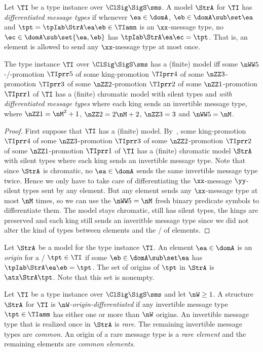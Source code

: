 \begin{definition}
Let $\TI$ be a type instance over $\ClSig\SigS\sms$.
A model $\StrA$ for $\TI$ has \emph{differentiated message types}
if whenever $\ea\in\domA$, $\eb\in\domA\sub\set\ea$
and $\tpt = \tpIab\StrA\ea\eb\in\TIamn$ is an $\xx$-message type,
no $\ec\in\domA\sub\set{\ea,\eb}$ has $\tpIab\StrA\ea\ec = \tpt$.
That is, an element is allowed to send any $\xx$-message type at most once.
\end{definition}
\begin{remark}\label{rem:prop-diff-msg-tp}
The type instance $\TI$ over $\ClSig\SigS\sms$ has a (finite) model
iff some $\nWW5$-\twotype/-promotion $\TIprr5$
of some king-promotion $\TIprr4$
of some $\nZZ3$-promotion $\TIprr3$
of some $\nZZ2$-promotion $\TIprr2$
of some $\nZZ1$-promotion $\TIprr1$ 
of $\TI$ has a (finite) chromatic model with silent types
and \emph{with differentiated message types} 
where each king sends an invertible message type,
where $\nZZ1 = \nM^2+1$, $\nZZ2 = 2\nM+2$, $\nZZ3 = 3$ and $\nWW5 = \nM$.
\end{remark}
\begin{proof}
First suppose that $\TI$ has a (finite) model.
By~,
some king-promotion $\TIprr4$
of some $\nZZ3$-promotion $\TIprr3$
of some $\nZZ2$-promotion $\TIprr2$
of some $\nZZ1$-promotion $\TIprr1$
of $\TI$ has a (finite) chromatic model $\StrA$ with silent types where each
king sends an invertible message type.
Note that since $\StrA$ is chromatic, no $\ea\in\domA$ sends the same invertible
message type twice.
Hence we only have to take care of differentiating the $\xx$-message
$\yy$-silent types sent by any element.
But any element sends any $\xx$-message type at most $\nM$ times, so we can use
the $\nWW5 = \nM$ fresh binary predicate symbols to differentiate them.
The model stays chromatic, still has silent types, the kings are preserved and
each king still sends an inveritble message type
since we did not alter the kind of types between elements and the \onetypes/ of
elements.
\end{proof}

\begin{definition}
Let $\StrA$ be a model for the type instance $\TI$.
An element $\ea\in\domA$ is an \emph{origin} for a \twotype/ $\tpt\in\TI$ if
some $\eb\in\domA\sub\set\ea$ has $\tpIab\StrA\ea\eb = \tpt$.
The set of origins of $\tpt$ in $\StrA$ is $\atx\StrA\tpt$.
Note that this set is nonempty.
\end{definition}
\begin{definition}
Let $\TI$ be a type instance over $\ClSig\SigS\sms$ and let $\nW\geq1$.
A structure $\StrA$ for $\TI$ is \emph{$\nW$-origin-differentiated}
if any invertible message type $\tpt\in\TIamm$ has either one or more than $\nW$
origins.
An invertible message type that is realized once in $\StrA$ is \emph{rare}.
The remaining invertible message types are \emph{common}.
An origin of a rare message type is a \emph{rare element} and the remaining
elements are \emph{common elements}.
\end{definition}

